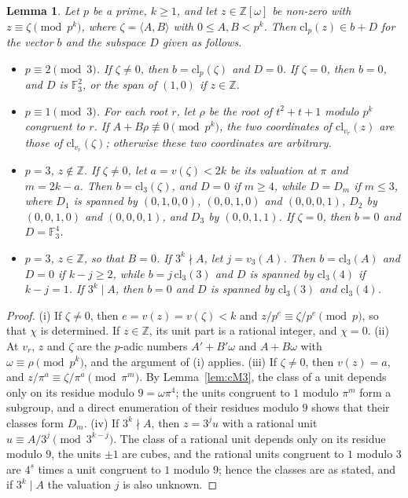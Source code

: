 \documentclass[11pt]{article}
\newtheorem{lemma}[theorem]{Lemma}
\newcommand{\Z}{\mathbb{Z}}
\newcommand{\F}{\mathbb{F}}
\begin{document}
\begin{lemma}\label{lem:cresidue}
Let $p$ be a prime, $k\geq1$, and let $z\in\Z[\omega]$ be non-zero with $z\equiv\zeta\pmod{p^k}$, where $\zeta=\langle A,B\rangle$ with $0\leq A,B<p^k$. Then $\mathrm{cl}_p(z)\in b+D$ for the vector $b$ and the subspace $D$ given as follows.
\begin{itemize}
\item[(i)] $p\equiv2\pmod3$. If $\zeta\neq0$, then $b=\mathrm{cl}_p(\zeta)$ and $D=0$. If $\zeta=0$, then $b=0$, and $D$ is $\F_3^2$, or the span of $(1,0)$ if $z\in\Z$.
\item[(ii)] $p\equiv1\pmod3$. For each root $r$, let $\rho$ be the root of $t^2+t+1$ modulo $p^k$ congruent to $r$. If $A+B\rho\not\equiv0\pmod{p^k}$, the two coordinates of $\mathrm{cl}_{v_r}(z)$ are those of $\mathrm{cl}_{v_r}(\zeta)$; otherwise these two coordinates are arbitrary.
\item[(iii)] $p=3$, $z\notin\Z$. If $\zeta\neq0$, let $a=v(\zeta)<2k$ be its valuation at $\pi$ and $m=2k-a$. Then $b=\mathrm{cl}_3(\zeta)$, and $D=0$ if $m\geq4$, while $D=D_m$ if $m\leq3$, where $D_1$ is spanned by $(0,1,0,0)$, $(0,0,1,0)$ and $(0,0,0,1)$, $D_2$ by $(0,0,1,0)$ and $(0,0,0,1)$, and $D_3$ by $(0,0,1,1)$. If $\zeta=0$, then $b=0$ and $D=\F_3^4$.
\item[(iv)] $p=3$, $z\in\Z$, so that $B=0$. If $3^k\nmid A$, let $j=v_3(A)$. Then $b=\mathrm{cl}_3(A)$ and $D=0$ if $k-j\geq2$, while $b=j\,\mathrm{cl}_3(3)$ and $D$ is spanned by $\mathrm{cl}_3(4)$ if $k-j=1$. If $3^k\mid A$, then $b=0$ and $D$ is spanned by $\mathrm{cl}_3(3)$ and $\mathrm{cl}_3(4)$.
\end{itemize}
\end{lemma}

\begin{proof}
(i) If $\zeta\neq0$, then $e=v(z)=v(\zeta)<k$ and $z/p^e\equiv\zeta/p^e\pmod p$, so that $\chi$ is determined. If $z\in\Z$, its unit part is a rational integer, and $\chi=0$. (ii) At $v_r$, $z$ and $\zeta$ are the $p$-adic numbers $A'+B'\omega$ and $A+B\omega$ with $\omega\equiv\rho\pmod{p^k}$, and the argument of (i) applies. (iii) If $\zeta\neq0$, then $v(z)=a$, and $z/\pi^a\equiv\zeta/\pi^a\pmod{\pi^m}$. By Lemma~\ref{lem:cM3}, the class of a unit depends only on its residue modulo $9=\omega\pi^4$; the units congruent to $1$ modulo $\pi^m$ form a subgroup, and a direct enumeration of their residues modulo $9$ shows that their classes form $D_m$. (iv) If $3^k\nmid A$, then $z=3^ju$ with a rational unit $u\equiv A/3^j\pmod{3^{k-j}}$. The class of a rational unit depends only on its residue modulo $9$, the units $\pm1$ are cubes, and the rational units congruent to $1$ modulo $3$ are $4^s$ times a unit congruent to $1$ modulo $9$; hence the classes are as stated, and if $3^k\mid A$ the valuation $j$ is also unknown.
\end{proof}
\end{document}
